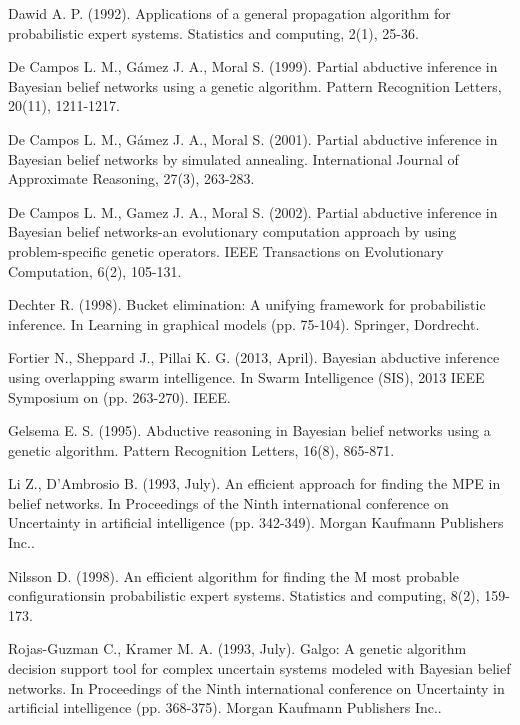 \documentclass[a4paper,11pt]{article}
\begin{document}

\begin{thebibliography}{}

Dawid A. P. (1992). Applications of a general propagation algorithm for probabilistic expert systems. Statistics and computing, 2(1), 25-36.

De Campos L. M., Gámez J. A., Moral S. (1999). Partial abductive inference in Bayesian belief networks using a genetic algorithm. Pattern Recognition Letters, 20(11), 1211-1217.

De Campos L. M., Gámez J. A., Moral S. (2001). Partial abductive inference in Bayesian belief networks by simulated annealing. International Journal of Approximate Reasoning, 27(3), 263-283.

De Campos L. M., Gamez J. A., Moral S. (2002). Partial abductive inference in Bayesian belief networks-an evolutionary computation approach by using problem-specific genetic operators. IEEE Transactions on Evolutionary Computation, 6(2), 105-131.

Dechter R. (1998). Bucket elimination: A unifying framework for probabilistic inference. In Learning in graphical models (pp. 75-104). Springer, Dordrecht.

Fortier N., Sheppard J., Pillai K. G. (2013, April). Bayesian abductive inference using overlapping swarm intelligence. In Swarm Intelligence (SIS), 2013 IEEE Symposium on (pp. 263-270). IEEE.

Gelsema E. S. (1995). Abductive reasoning in Bayesian belief networks using a genetic algorithm. Pattern Recognition Letters, 16(8), 865-871.

Li Z., D'Ambrosio B. (1993, July). An efficient approach for finding the MPE in belief networks. In Proceedings of the Ninth international conference on Uncertainty in artificial intelligence (pp. 342-349). Morgan Kaufmann Publishers Inc..

Nilsson D. (1998). An efficient algorithm for finding the M most probable configurationsin probabilistic expert systems. Statistics and computing, 8(2), 159-173.

Rojas-Guzman C., Kramer M. A. (1993, July). Galgo: A genetic algorithm decision support tool for complex uncertain systems modeled with Bayesian belief networks. In Proceedings of the Ninth international conference on Uncertainty in artificial intelligence (pp. 368-375). Morgan Kaufmann Publishers Inc..


\end{thebibliography}
\end{document}
